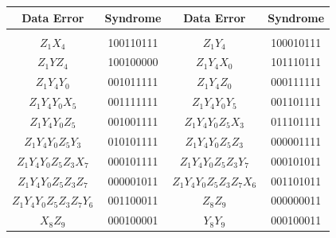\documentclass[reprint, amsmath,amssymb, aps,pra,
 floatfix,
]{revtex4-2}
\newcommand{\PadCell}[1]{\kern8pt#1\kern8pt}
\newcommand{\PadCellColor}[2]{\cellcolor{#1}\kern8pt#2\kern8pt}
\begin{document}
\begin{table}[ht]
\centering
\scriptsize

  \setlength{\tabcolsep}{0pt} %
  \renewcommand{\arraystretch}{1.4} %

  \begin{tabular}{|c|c|c|c|}
    \hline
    \textbf{ Data Error } & \textbf{ Syndrome } & \textbf{ Data Error } & \textbf{ Syndrome } \\ \hline

    \rowcolor{gray!20}
    \multicolumn{4}{|c|}{\boldmath\textbf{$Y_0 Z_1 Z_3 Y_4 Z_5 Z_6 Z_7Z_8Z_9$} $\longrightarrow$ $Z_1Y_4Y_0Z_5Z_3 Z_7Z_6Z_8Z_9$} \\ \hline

    $Z_1X_4$                    & 100110111    & $Z_1Y_4$                      &  100010111      \\ \hline
    $Z_1YZ_4$                   & 100100000    & $Z_1Y_4X_0$                   &  101110111      \\ \hline
    $Z_1Y_4Y_0$                 & 001011111    & $Z_1Y_4Z_0$                   &  000111111      \\ \hline
    $Z_1Y_4Y_0X_5$              & 001111111    & $Z_1Y_4Y_0Y_5$                &  001101111      \\ \hline
    $Z_1Y_4Y_0Z_5$              & 001001111    & $Z_1Y_4Y_0Z_5X_3$             &  011101111      \\ \hline
    $Z_1Y_4Y_0Z_5Y_3$           & 010101111    & $Z_1Y_4Y_0Z_5Z_3$             &  000001111      \\ \hline
    $Z_1Y_4Y_0Z_5Z_3X_7$        & 000101111    & $Z_1Y_4Y_0Z_5Z_3Y_7$          &  000101011      \\ \hline
    $Z_1Y_4Y_0Z_5Z_3Z_7$        & 000001011    & $Z_1Y_4Y_0Z_5Z_3Z_7X_6$       &  001101011      \\ \hline
    $Z_1Y_4Y_0Z_5Z_3Z_7Y_6$     & 001100011    & $Z_8Z_9$                      &  000000011   \\ \hline
    $X_8Z_9$                    & 000100001    & $Y_8Y_9$                      &  000100011  \\ \hline



\end{tabular}
\end{table}
\end{document}
